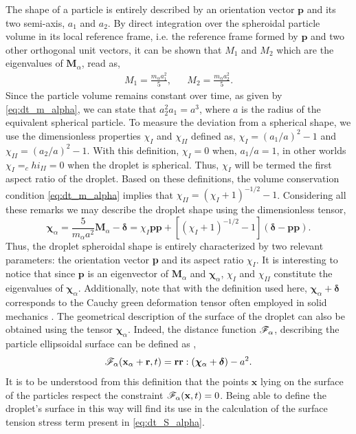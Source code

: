 The shape of a particle is entirely described by an orientation vector $\textbf{p}$ and its two semi-axis, $a_1$ and $a_2$.  
By direct integration over the spheroidal particle volume in its local reference frame, i.e. the reference frame formed by $\textbf{p}$ and two other orthogonal unit vectors, it can be shown that $M_1$ and $M_2$ which are the eigenvalues of $\textbf{M}_\alpha$, read as,
\begin{align*}
    M_1 = \frac{m_\alpha a_1^2}{5},
    && M_2 = \frac{m_\alpha a_2^2}{5}.
\end{align*}
Since the particle volume remains constant over time, as given by  \ref{eq:dt_m_alpha}, we can state that $a_2^2 a_1 =a^3$, where $a$ is the radius of the equivalent spherical particle.
To measure the deviation from a spherical shape, we use the dimensionless properties $\chi_I$ and $\chi_{II}$ defined as, $\chi_I = (a_1/a)^2 - 1$ and $\chi_{II} = (a_2/a)^2 - 1$. 
With this definition, $\chi_I = 0$ when, $a_1/a =1$, in other worlds $\chi_I =_chi_{II} = 0$ when the droplet is spherical. 
Thus, $\chi_I$ will be termed the first aspect ratio of the droplet.  
Based on these definitions, the volume conservation condition \eqref{eq:dt_m_alpha} implies that $\chi_{II} = (\chi_I + 1)^{-1/2} - 1$.
Considering all these remarks we may describe the droplet shape using the dimensionless tensor, 
\begin{equation*}
    \bm\chi_\alpha
    = \frac{5}{m_\alpha a^2}\textbf{M}_\alpha - \bm\delta
    = \chi_I \textbf{pp}
        +[(\chi_I + 1)^{-1/2} - 1 ] (\bm\delta - \textbf{pp}). 
\end{equation*}
Thus, the droplet spheroidal shape is entirely characterized by two relevant parameters: the orientation vector \textbf{p} and its aspect ratio $\chi_I$.
It is interesting to notice that since $\textbf{p}$ is an eigenvector of $\textbf{M}_\alpha$ and $\bm\chi_\alpha$, $\chi_I$ and $\chi_{II}$ constitute the eigenvalues of $\bm\chi_\alpha$. 
Additionally, note that with the definition used here, $\bm\chi_\alpha +\bm\delta$ corresponds to the Cauchy green deformation tensor often employed in solid mechanics \citep{mwasame2018macroscopic}. 
The geometrical description of the surface of the droplet can also be obtained using the tensor $\bm\chi_\alpha$. 
Indeed, the distance function  $\mathscr{F}_\alpha$, describing the particle ellipsoidal surface can be defined as \citep{nadim1996concise},  
\begin{equation*}
    \FF_\alpha(\textbf{x}_\alpha +\textbf{r},t) = \textbf{rr}:(\bm\chi_\alpha +\bm\delta)-a^2.  
    \label{eq:distance_function}
\end{equation*}
It is to be understood from this definition that the points $\textbf{x}$ lying on the surface of the particles respect the constraint $\mathscr{F}_\alpha(\textbf{x},t) = 0$. 
Being able to define the droplet's surface in this way will find its use in the calculation of the surface tension stress term present in \ref{eq:dt_S_alpha}. 

